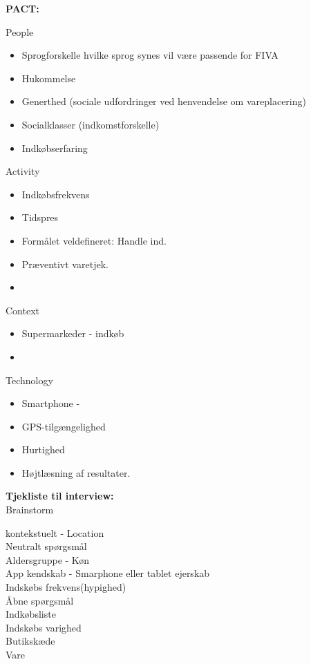 \documentclass[12pt]{article}
\begin{document}
\textbf{PACT:}

People
\begin{itemize}
\item Sprogforskelle hvilke sprog synes vil v\ae re passende for FIVA
\item Hukommelse 
\item Generthed (sociale udfordringer ved henvendelse om vareplacering)
\item Socialklasser (indkomstforskelle)
\item Indkøbserfaring
\end{itemize}

Activity
\begin{itemize}
\item Indkøbsfrekvens  
\item Tidspres
\item Formålet veldefineret: Handle ind.
\item Præventivt varetjek. 
\item   
\end{itemize}


Context
\begin{itemize}
\item Supermarkeder - indkøb 
\item  
\end{itemize}


Technology
\begin{itemize}
\item Smartphone -   
\item GPS-tilgængelighed
\item Hurtighed
\item Højtlæsning af resultater. 
\end{itemize}

\textbf{Tjekliste til interview:}\\


Brainstorm

  kontekstuelt - Location \\

  Neutralt sp\o rgsm\aa l \\

  Aldersgruppe - K\o n \\

  App kendskab - Smarphone eller tablet ejerskab \\ 

  Indsk\o bs frekvens(hypighed) \\

  \AA bne sp\o rgsm\aa l \\ 

  Indk\o bsliste \\
  
  Indsk\o bs varighed \\
  
  Butiksk\ae de \\

  Vare \\
    
\end{document}
